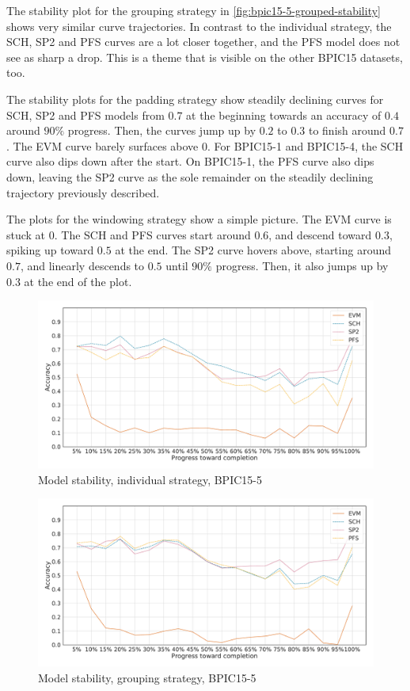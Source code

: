 The stability plot for the grouping strategy in \autoref{fig:bpic15-5-grouped-stability} shows very similar curve trajectories.
In contrast to the individual strategy, the SCH, SP2 and PFS curves are a lot closer together, and the PFS model does not see as sharp a drop.
This is a theme that is visible on the other BPIC15 datasets, too.

The stability plots for the padding strategy show steadily declining curves for SCH, SP2 and PFS models from $0.7$ at the beginning towards an accuracy of $0.4$ around $90\%$ progress.
Then, the curves jump up by $0.2$ to $0.3$ to finish around $0.7$.
The EVM curve barely surfaces above $0$.
For BPIC15-1 and BPIC15-4, the SCH curve also dips down after the start.
On BPIC15-1, the PFS curve also dips down, leaving the SP2 curve as the sole remainder on the steadily declining trajectory previously described.

The plots for the windowing strategy show a simple picture.
The EVM curve is stuck at 0.
The SCH and PFS curves start around $0.6$, and descend toward $0.3$, spiking up toward $0.5$ at the end.
The SP2 curve hovers above, starting around $0.7$, and linearly descends to $0.5$ until $90\%$ progress.
Then, it also jumps up by $0.3$ at the end of the plot.

\begin{figure}[!htb]
    \centering
    \includegraphics[width=\textwidth]{gfx/bpic2015_5/individual_stability.pdf}
    \caption{Model stability, individual strategy, BPIC15-5}
    \label{fig:bpic15-5-individual-stability}
\end{figure}
\begin{figure}[!htb]
    \centering
    \includegraphics[width=\textwidth]{gfx/bpic2015_5/grouped_stability.pdf}
    \caption{Model stability, grouping strategy, BPIC15-5}
    \label{fig:bpic15-5-grouped-stability}
\end{figure}

